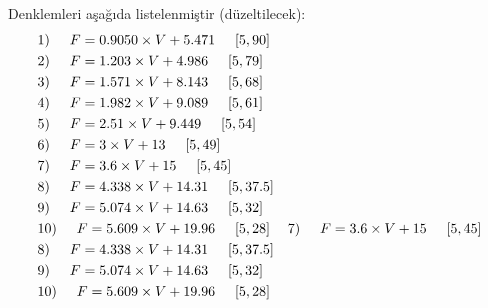 \documentclass[10pt,a4paper]{article}
\begin{document}
Denklemleri aşağıda listelenmiştir (düzeltilecek):
\begin{align}
&1) \hspace{5mm} F = 0.9050 \times V + 5.471 \hspace{5mm} [5,90] \\
&2) \hspace{5mm} F = 1.203 \times V + 4.986 \hspace{5mm} [5,79] \nonumber \\
&3) \hspace{5mm} F = 1.571 \times V + 8.143 \hspace{5mm} [5,68] \nonumber \\
&4) \hspace{5mm} F = 1.982 \times V + 9.089 \hspace{5mm} [5,61] \nonumber \\
&5) \hspace{5mm} F = 2.51 \times V + 9.449 \hspace{5mm} [5,54] \nonumber \\
&6) \hspace{5mm} F = 3 \times V + 13 \hspace{5mm} [5,49] \nonumber \\
&7) \hspace{5mm} F = 3.6 \times V + 15 \hspace{5mm} [5,45] \nonumber \\
&8) \hspace{5mm} F = 4.338 \times V + 14.31 \hspace{5mm} [5,37.5] \nonumber \\
&9) \hspace{5mm} F = 5.074 \times V + 14.63 \hspace{5mm} [5,32] \nonumber \\
&10) \hspace{5mm} F = 5.609 \times V + 19.96 \hspace{5mm} [5,28] \nonumber 
&7) \hspace{5mm} F = 3.6 \times V + 15 \hspace{5mm} [5,45] \nonumber \\
&8) \hspace{5mm} F = 4.338 \times V + 14.31 \hspace{5mm} [5,37.5] \nonumber \\
&9) \hspace{5mm} F = 5.074 \times V + 14.63 \hspace{5mm} [5,32] \nonumber \\
&10) \hspace{5mm} F = 5.609 \times V + 19.96 \hspace{5mm} [5,28] \nonumber 
\end{align}
\end{document}
